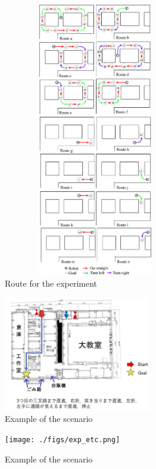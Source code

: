 \documentclass{sice-si}
\begin{document}
\printbibliography[title=参考文献]
\setlength\textfloatsep{0pt}
\begin{figure}[htbp]\vspace*{-0.5zh}
    \centering
     \includegraphics[height=120mm,width=80mm]{./figs/route.png}
     \caption{Route for the experiment}\label{fig:newroute}
\end{figure}

\begin{figure}[H]
    \centering
     \includegraphics[height=50mm]{./figs/scenario24.png}
     \caption{Example of the scenario}\label{fig:scenario24}
\end{figure}
\begin{figure}[htbp]
    \centering
     \texttt{[image: ./figs/exp\_etc.png]}
     \caption{Example of the scenario}\label{fig:exp}
\end{figure}
        
\end{document}
